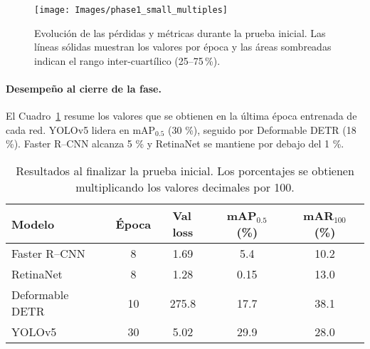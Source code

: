 \begin{figure}[!ht]
  \centering
  \texttt{[image: Images/phase1\_small\_multiples]}
  \caption[Curvas de pérdida y métricas de la Fase 1]{Evolución de las pérdidas y métricas durante la prueba inicial. Las líneas sólidas muestran los valores por época y las áreas sombreadas indican el rango inter-cuartílico (25–75\,\%).}
  \label{fig:phase1_small_multiples}
\end{figure}

\paragraph{Desempeño al cierre de la fase.}
El Cuadro~\ref{tab:fase1_final} resume los valores que se obtienen en la última época entrenada de cada red.
YOLOv5 lidera en mAP$_{0.5}$ (30 \%), seguido por Deformable DETR (18 \%).
Faster R–CNN alcanza 5 \% y RetinaNet se mantiene por debajo del 1 \%.

\begin{table}[!ht]
  \centering
  \begin{tabular}{lcccc}
    \hline
    \textbf{Modelo} & \textbf{Época} & \textbf{Val\,loss} & \textbf{mAP$_{0.5}$ (\%)} & \textbf{mAR$_{100}$ (\%)}\\
    \hline
    Faster R–CNN        & 8  & 1.69  & 5.4  & 10.2 \\
    RetinaNet           & 8  & 1.28  & 0.15 & 13.0 \\
    Deformable DETR     & 10 & 275.8 & 17.7 & 38.1 \\
    YOLOv5              & 30 & 5.02  & 29.9 & 28.0 \\
    \hline
  \end{tabular}
  \caption[Resumen cuantitativo de la Fase 1]{Resultados al finalizar la prueba inicial. Los porcentajes se obtienen multiplicando los valores decimales por 100.}
  \label{tab:fase1_final}
\end{table}

